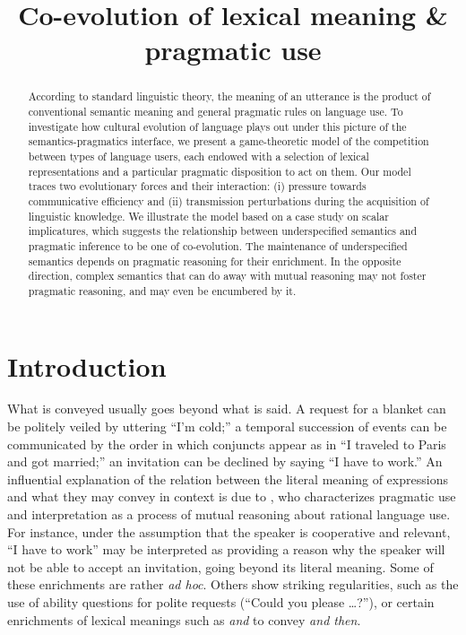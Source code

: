 \documentclass[a4paper, 11pt]{article}
\title{Co-evolution of lexical meaning \& pragmatic use}
\date{}
\theoremstyle{Satz}
\begin{document}

\maketitle

\begin{abstract}
 According to standard linguistic theory, the meaning of an utterance is the product of
  conventional semantic meaning and general pragmatic rules on language use. To investigate how
  cultural evolution of language plays out under this picture of the semantics-pragmatics
  interface, we present a game-theoretic model of the competition between types of language
  users, each endowed with a selection of lexical representations and a particular pragmatic
  disposition to act on them. Our model traces two evolutionary forces and their interaction:
  (i) pressure towards communicative efficiency and (ii) transmission perturbations during the acquisition of
  linguistic knowledge. We illustrate the model based on a case study on scalar
  implicatures, which suggests the relationship between underspecified semantics and pragmatic inference to be one of co-evolution. The maintenance of underspecified semantics depends on pragmatic reasoning for their enrichment. In the opposite direction, complex semantics that can do away with mutual reasoning may not foster pragmatic reasoning, and may even be encumbered by it.
\end{abstract}

\section{Introduction}\label{sec:introduction}

What is conveyed usually goes beyond what is said. A request for a blanket can be politely
veiled by uttering ``I'm cold;'' a temporal succession of events can be communicated by the order
in which conjuncts appear as in ``I traveled to Paris and got married;'' an invitation can be
declined by saying ``I have to work.'' An influential explanation of the relation between the
literal meaning of expressions and what they may convey in context is due to
\citet{grice:1975}, who characterizes pragmatic use and interpretation as a process of mutual
reasoning about rational language use. For instance, under the assumption that the speaker is
cooperative and relevant, ``I have to work'' may be interpreted as providing a reason why the
speaker will not be able to accept an invitation, going beyond its literal meaning. Some of
these enrichments are rather \emph{ad hoc}. Others show striking regularities, such as the use
of ability questions for polite requests (``Could you please \dots?''), or certain enrichments
of lexical meanings such as \emph{and} to convey \emph{and then}.
\end{document}
